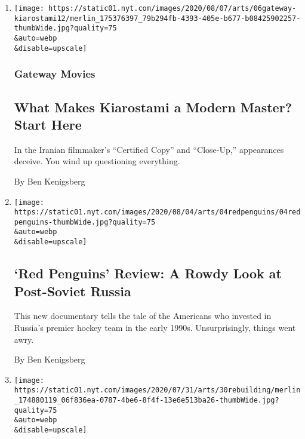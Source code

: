 \begin{enumerate}
\def\labelenumi{\arabic{enumi}.}
\item
  \href{/2020/08/06/movies/abbas-kiarostami-iran.html}{}

  \texttt{[image: https://static01.nyt.com/images/2020/08/07/arts/06gateway-kiarostami12/merlin\_175376397\_79b294fb-4393-405e-b677-b08425902257-thumbWide.jpg?quality=75\\\&auto=webp\\\&disable=upscale]}

  \hypertarget{gateway-movies}{%
  \subsubsection{Gateway Movies}\label{gateway-movies}}

  \hypertarget{what-makes-kiarostami-a-modern-master-start-here}{%
  \subsection{What Makes Kiarostami a Modern Master? Start
  Here}\label{what-makes-kiarostami-a-modern-master-start-here}}

  In the Iranian filmmaker's ``Certified Copy'' and ``Close-Up,''
  appearances deceive. You wind up questioning everything.

  By Ben Kenigsberg
\item
  \href{/2020/08/04/movies/red-penguins-review.html}{}

  \texttt{[image: https://static01.nyt.com/images/2020/08/04/arts/04redpenguins/04redpenguins-thumbWide.jpg?quality=75\\\&auto=webp\\\&disable=upscale]}

  \hypertarget{red-penguins-review-a-rowdy-look-at-post-soviet-russia}{%
  \subsection{`Red Penguins' Review: A Rowdy Look at Post-Soviet
  Russia}\label{red-penguins-review-a-rowdy-look-at-post-soviet-russia}}

  This new documentary tells the tale of the Americans who invested in
  Russia's premier hockey team in the early 1990s. Unsurprisingly,
  things went awry.

  By Ben Kenigsberg
\item
  \href{/2020/07/30/movies/rebuilding-paradise-review.html}{}

  \texttt{[image: https://static01.nyt.com/images/2020/07/31/arts/30rebuilding/merlin\_174880119\_06f836ea-0787-4be6-8f4f-13e6e513ba26-thumbWide.jpg?quality=75\\\&auto=webp\\\&disable=upscale]}


\end{enumerate}
